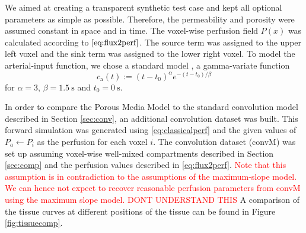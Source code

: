 \documentclass[paper=a4, fontsize=11pt,parskip=half,headings=small]{scrartcl}
\newcommand{\ca}{c_\mathrm{a}}
\begin{document}
	We aimed at creating a transparent synthetic test case and kept all optional parameters as simple as possible. 
	Therefore, the permeability and porosity were assumed constant in space and in time.
	The voxel-wise perfusion field $P(x)$ was calculated according to $\eqref{eq:flux2perf}$. 
	The source term was assigned to the upper left voxel and the sink term was assigned to the lower right voxel.
	To model the arterial-input function, we chose a standard model \cite{ostergaard96}, a gamma-variate \cite{chan04} function
	\begin{equation}
		\ca(t) := (t-t_0)^\alpha e^{-(t-t_0)/\beta}
	\end{equation}
	for $\alpha=3$, $\beta = \SI{1.5}{\second}$ and $t_0 = \SI{0}{\second}$.
	
	
	In order to compare the Porous Media Model to the standard convolution model described in Section \ref{sec:conv}, an additional convolution dataset was built. This forward simulation was generated using \eqref{eq:classicalperf} and the given values of $P_a \leftarrow P_i$ as the perfusion for each voxel $i$.
	The convolution dataset (convM) was set up assuming voxel-wise well-mixed compartments described in Section \ref{sec:comp} and the perfusion values described in \eqref{eq:flux2perf}.
	\textcolor{red}{
	Note that this assumption is in contradiction to the assumptions of the maximum-slope model.
	We can hence not expect to recover reasonable perfusion parameters from convM using the maximum slope model. DONT UNDERSTAND THIS}
	A comparison of the tissue curves at different positions of the tissue can be found in Figure \ref{fig:tissuecomp}. 
\end{document}
